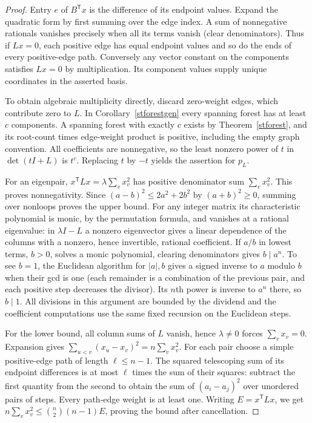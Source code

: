 \begin{proof}
Entry $e$ of $B^{\mathsf T}x$ is the difference of its endpoint values. Expand the quadratic form by first summing over the edge index. A sum of nonnegative rationals vanishes precisely when all its terms vanish (clear denominators). Thus if $Lx=0$, each positive edge has equal endpoint values and so do the ends of every positive-edge path. Conversely any vector constant on the components satisfies $Lx=0$ by multiplication. Its component values supply unique coordinates in the asserted basis.

To obtain algebraic multiplicity directly, discard zero-weight edges, which contribute zero to $L$. In Corollary~\ref{stforestgen} every spanning forest has at least $c$ components. A spanning forest with exactly $c$ exists by Theorem~\ref{stforest}, and its root-count times edge-weight product is positive, including the empty graph convention. All coefficients are nonnegative, so the least nonzero power of $t$ in $\det(tI+L)$ is $t^c$. Replacing $t$ by $-t$ yields the assertion for $p_L$.

For an eigenpair, $x^{\mathsf T}Lx=\lambda\sum_v x_v^2$ has positive denominator sum $\sum_v x_v^2$. This proves nonnegativity. Since $(a-b)^2\le2a^2+2b^2$ by $(a+b)^2\ge0$, summing over nonloops proves the upper bound. For any integer matrix its characteristic polynomial is monic, by the permutation formula, and vanishes at a rational eigenvalue: in $\lambda I-L$ a nonzero eigenvector gives a linear dependence of the columns with a nonzero, hence invertible, rational coefficient. If $a/b$ in lowest terms, $b>0$, solves a monic polynomial, clearing denominators gives $b\mid a^n$. To see $b=1$, the Euclidean algorithm for $|a|,b$ gives a signed inverse to $a$ modulo $b$ when their gcd is one (each remainder is a combination of the previous pair, and each positive step decreases the divisor). Its $n$th power is inverse to $a^n$ there, so $b\mid1$. All divisions in this argument are bounded by the dividend and the coefficient computations use the same fixed recursion on the Euclidean steps.

For the lower bound, all column sums of $L$ vanish, hence $\lambda\ne0$ forces $\sum_v x_v=0$. Expansion gives $\sum_{u<v}(x_u-x_v)^2=n\sum_v x_v^2$. For each pair choose a simple positive-edge path of length $\ell\le n-1$. The squared telescoping sum of its endpoint differences is at most $\ell$ times the sum of their squares: subtract the first quantity from the second to obtain the sum of $(a_i-a_j)^2$ over unordered pairs of steps. Every path-edge weight is at least one. Writing $E=x^{\mathsf T}Lx$, we get $n\sum_v x_v^2\le\binom n2(n-1)E$, proving the bound after cancellation.
\end{proof}

